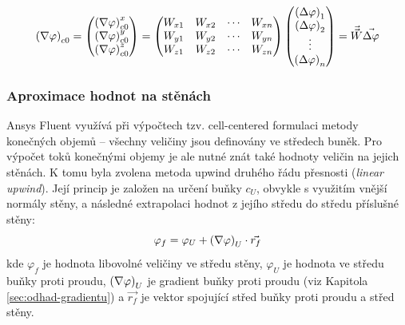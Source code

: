             \begin{equation}
                \left( \nabla \varphi \right) _{c0} = \begin{pmatrix}
                    \left( \nabla \varphi \right) _{c0} ^x \\
                    \left( \nabla \varphi \right) _{c0} ^y \\
                    \left( \nabla \varphi \right) _{c0} ^z 
                \end{pmatrix} = \begin{pmatrix}
                    W_{x1} & W_{x2} & \cdots & W_{xn} \\
                    W_{y1} & W_{y2} & \cdots & W_{yn} \\
                    W_{z1} & W_{z2} & \cdots & W_{zn} 
                \end{pmatrix} \begin{pmatrix}
                    \left( \Delta \varphi \right) _1 \\
                    \left( \Delta \varphi \right) _2 \\
                    \vdots \\
                    \left( \Delta \varphi \right) _n
                \end{pmatrix} = \Vec{\Vec{W}} \Vec{\Delta \varphi}
            \end{equation}
        \subsubsection{Aproximace hodnot na stěnách}
            Ansys Fluent využívá při výpočtech tzv. cell-centered formulaci metody konečných objemů – všechny veličiny jsou definovány ve středech buněk. Pro výpočet toků konečnými objemy je ale nutné znát také hodnoty veličin na jejich stěnách. K tomu byla zvolena metoda upwind druhého řádu přesnosti (\textit{linear upwind}). Její princip je založen na určení buňky  $c _U$, obvykle s využitím vnější normály stěny, a následné extrapolaci hodnot z jejího středu do středu příslušné stěny:
            \begin{equation}
                \varphi _{f} = \varphi _U + \left( \nabla \varphi \right) _U \cdot \Vec{r _f}
            \end{equation}
            \noindent kde $\varphi _f$ je hodnota libovolné veličiny ve středu stěny, $\varphi _U$ je hodnota ve středu buňky proti proudu, $\left( \nabla \varphi \right) _U$ je gradient buňky proti proudu (viz Kapitola \ref{sec:odhad-gradientu}) a $\Vec{r_f}$ je vektor spojující střed buňky proti proudu a střed stěny.

